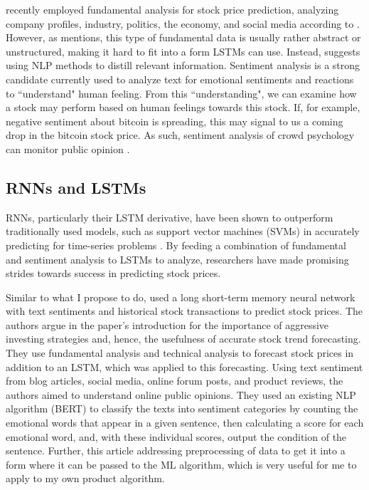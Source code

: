 \documentclass[10pt,twocolumn]{article}
\begin{document}
\cite{ReviewAndTaxonomyOfPredictionTechniques} recently employed fundamental analysis for stock price prediction, analyzing company profiles, industry, politics, the economy, and social media according to \cite{LSTMSentimentAnalysis}. However, as \cite{LSTMSentimentAnalysis} mentions, this type of fundamental data is usually rather abstract or unstructured, making it hard to fit into a form LSTMs can use. Instead, \cite{LSTMSentimentAnalysis} suggests using NLP methods to distill relevant information. Sentiment analysis is a strong candidate currently used to analyze text for emotional sentiments and reactions to ``understand" human feeling. From this ``understanding", we can examine how a stock may perform based on human feelings towards this stock. If, for example, negative sentiment about bitcoin is spreading, this may signal to us a coming drop in the bitcoin stock price. As such, sentiment analysis of crowd psychology can monitor public opinion \cite{LSTMSentimentAnalysis}.

\subsection{RNNs and LSTMs}

RNNs, particularly their LSTM derivative, have been shown to outperform traditionally used models, such as support vector machines (SVMs) in accurately predicting for time-series problems \cite{LSTMSentimentAnalysis}. By feeding a combination of fundamental and sentiment analysis to LSTMs to analyze, researchers have made promising strides towards success in predicting stock prices.

Similar to what I propose to do,  used a long short-term memory neural network with text sentiments and historical stock transactions to predict stock prices. The authors argue in the paper's introduction for the importance of aggressive investing strategies and, hence, the usefulness of accurate stock trend forecasting. They use fundamental analysis and technical analysis to forecast stock prices in addition to an LSTM, which was applied to this forecasting. Using text sentiment from blog articles, social media, online forum posts, and product reviews, the authors aimed to understand online public opinions. They used an existing NLP algorithm (BERT) to classify the texts into sentiment categories by counting the emotional words that appear in a given sentence, then calculating a score for each emotional word, and, with these individual scores, output the condition of the sentence. Further, this article addressing preprocessing of data to get it into a form where it can be passed to the ML algorithm, which is very useful for me to apply to my own product algorithm.
\end{document}
